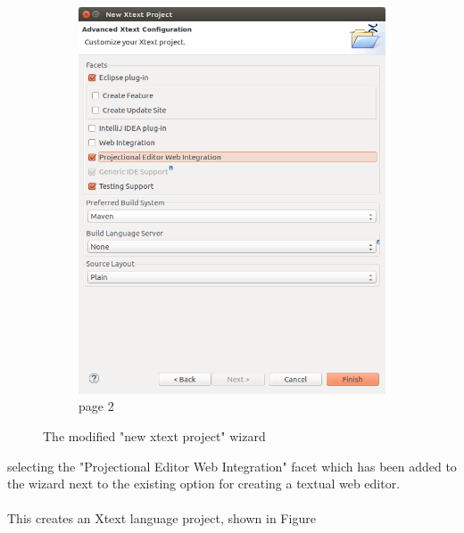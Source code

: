 \documentclass{article}
\begin{document}
\begin{figure}[t!]
\begin{subfigure}[b]{0.45\linewidth}
    \includegraphics[width=\linewidth]{./Screenshots/newXtextProjectPage2.png}
    \caption{page 2}
  \end{subfigure}
  \caption{The modified "new xtext project" wizard}
  \label{fig:newProjectWiz}
\end{figure}
selecting the "Projectional Editor Web Integration" facet which has been added to the wizard next to the existing option for creating a textual web editor.
\\
\\
This creates an Xtext language project, shown in Figure
\end{document}
